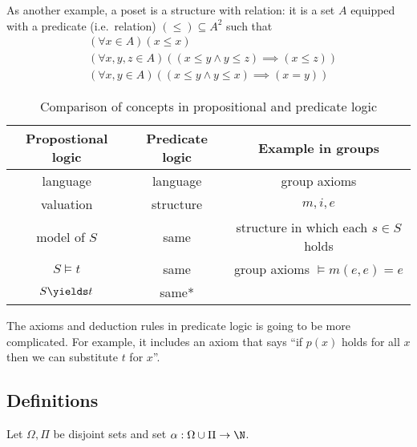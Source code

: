 \documentclass[a4paper]{article}
\begin{document}
As another example, a poset is a structure with relation: it is a set \(A\) equipped with a predicate (i.e.\ relation) \((\leq) \subseteq A^2\) such that
\begin{align*}
  & (\forall x \in A) (x \leq x) \\
  & (\forall x, y, z \in A) ((x \leq y \land y \leq z) \implies (x \leq z)) \\
  & (\forall x, y \in A) ((x \leq y \land y \leq x) \implies (x = y))
\end{align*}

\begin{table}[ht]
  \centering
  \begin{tabular}{|c|c|c|}
    \hline
    Propostional logic & Predicate logic & Example in groups \\ \hline
    language & language & group axioms \\ \hline
    valuation & structure & \(m, i, e\) \\ \hline
    model of \(S\) & same & structure in which each \(s \in S\) holds \\ \hline
    \(S \models t\) & same & group axioms \(\models m(e, e) = e\) \\ \hline
    \(S \yields t\) & same* & \\ \hline
  \end{tabular}
  \caption{Comparison of concepts in propositional and predicate logic}
\end{table}

The axioms and deduction rules in predicate logic is going to be more complicated. For example, it includes an axiom that says ``if \(p(x)\) holds for all \(x\) then we can substitute \(t\) for \(x\)''.

\subsection{Definitions}

Let \(\Omega, \Pi\) be disjoint sets and set \(\alpha: \Omega \cup \Pi \to \N\).
\end{document}
